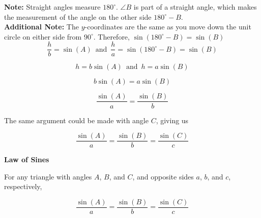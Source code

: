 \documentclass{ximera}
\begin{document}
\textbf{Note:}  Straight angles measure $180^{\circ}$.  $\angle B$ is part of a straight angle, which makes the measurement of the angle on the other side $180^{\circ} - B$. \\

\textbf{Additional Note:} The $y$-coordinates are the same as you move down the unit circle on either side from $90^{\circ}$.  Therefore, $\sin(180^{\circ} - B) = \sin(B)$ \\




\[    \frac{h}{b} = \sin(A)   \, \text{ and } \,    \frac{h}{a} = \sin(180^{\circ} - B)  = \sin(B)      \]



\[    h = b \sin(A)      \, \text{ and } \,    h = a \sin(B)    \]

\[     b \sin(A)  = a \sin(B)    \]


\[    \frac{\sin(A)}{a} = \frac{\sin(B)}{b}      \]




The same argument could be made with angle $C$, giving us








\[    \frac{\sin(A)}{a} = \frac{\sin(B)}{b}  = \frac{\sin(C)}{c}    \]






\begin{theorem}  \textbf{\textcolor{green!50!black}{Law of Sines}} 



For any triangle with angles $A$, $B$, and $C$, and opposite sides $a$, $b$, and $c$, respectively, 


\[    \frac{\sin(A)}{a} = \frac{\sin(B)}{b}  = \frac{\sin(C)}{c}    \]


\end{theorem}
\end{document}
